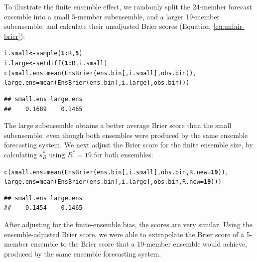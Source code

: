 \documentclass[article]{jss}\usepackage[]{graphicx}\usepackage[]{color}
\makeatletter
\newcommand{\hlnum}[1]{\textcolor[rgb]{0.502,0,0.502}{\textbf{#1}}}%
\newcommand{\hlopt}[1]{\textcolor[rgb]{1,0,0.502}{\textbf{#1}}}%
\newcommand{\hlstd}[1]{\textcolor[rgb]{0,0,0}{#1}}%
\newcommand{\hlkwb}[1]{\textcolor[rgb]{0.502,0.502,0.753}{\textbf{#1}}}%
\newcommand{\hlkwc}[1]{\textcolor[rgb]{0,0.502,0.753}{#1}}%
\newcommand{\hlkwd}[1]{\textcolor[rgb]{0,0.267,0.4}{#1}}%
\newenvironment{kframe}{%
 \def\at@end@of@kframe{}%
 \ifinner\ifhmode%
  \def\at@end@of@kframe{\end{minipage}}%
  \begin{minipage}{\columnwidth}%
 \fi\fi%
 \def\FrameCommand##1{\hskip\@totalleftmargin \hskip-\fboxsep
 \colorbox{shadecolor}{##1}\hskip-\fboxsep
     \hskip-\linewidth \hskip-\@totalleftmargin \hskip\columnwidth}%
 \MakeFramed {\advance\hsize-\width
   \@totalleftmargin\z@ \linewidth\hsize
   \@setminipage}}%
 {\par\unskip\endMakeFramed%
 \at@end@of@kframe}
\newenvironment{knitrout}{}{} %
\makeatother
\begin{document}
To illustrate the finite ensemble effect, we randomly split the 24-member forecast ensemble  into a small 5-member subensemble, and a larger 19-member subensemble, and calculate their unadjusted Brier scores (Equation~\ref{eq:unfair-brier}):
%
\begin{knitrout}
\color{fgcolor}\begin{kframe}
\begin{alltt}
\hlstd{i.small} \hlkwb{<-} \hlkwd{sample}\hlstd{(}\hlnum{1}\hlopt{:}\hlstd{R,} \hlnum{5}\hlstd{)}
\hlstd{i.large} \hlkwb{<-} \hlkwd{setdiff}\hlstd{(}\hlnum{1}\hlopt{:}\hlstd{R, i.small)}
\hlkwd{c}\hlstd{(}\hlkwc{small.ens}\hlstd{=}\hlkwd{mean}\hlstd{(}\hlkwd{EnsBrier}\hlstd{(ens.bin[, i.small], obs.bin)),}
  \hlkwc{large.ens}\hlstd{=}\hlkwd{mean}\hlstd{(}\hlkwd{EnsBrier}\hlstd{(ens.bin[, i.large], obs.bin)))}
\end{alltt}
\begin{verbatim}
## small.ens large.ens 
##    0.1689    0.1465
\end{verbatim}
\end{kframe}
\end{knitrout}
%
The large subensemble obtains a better average Brier score than the small subensemble, even though both ensembles were produced by the same ensemble forecasting system.
We next adjust the Brier score for the finite ensemble size, by calculating $s_{B}^*$ using $R^*=19$ for both ensembles:
%
\begin{knitrout}
\color{fgcolor}\begin{kframe}
\begin{alltt}
\hlkwd{c}\hlstd{(}\hlkwc{small.ens}\hlstd{=}\hlkwd{mean}\hlstd{(}\hlkwd{EnsBrier}\hlstd{(ens.bin[, i.small], obs.bin,} \hlkwc{R.new}\hlstd{=}\hlnum{19}\hlstd{)),}
  \hlkwc{large.ens}\hlstd{=}\hlkwd{mean}\hlstd{(}\hlkwd{EnsBrier}\hlstd{(ens.bin[, i.large], obs.bin,} \hlkwc{R.new}\hlstd{=}\hlnum{19}\hlstd{)))}
\end{alltt}
\begin{verbatim}
## small.ens large.ens 
##    0.1454    0.1465
\end{verbatim}
\end{kframe}
\end{knitrout}
%
After adjusting for the finite-ensemble bias, the scores are very similar. 
Using the ensemble-adjusted Brier score, we were able to extrapolate the Brier score of a 5-member ensemble to the Brier score that a 19-member ensemble would achieve, produced by the same ensemble forecasting system. 
\end{document}
